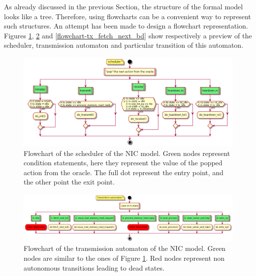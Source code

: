 \documentclass{kththesis}
\begin{document}
As already discussed in the previous Section, the structure of the formal model looks like a tree. Therefore, using flowcharts can be a convenient way to represent such structures. An attempt has been made to design a flowchart representation. Figures \ref{flowchart-scheduler}, \ref{flowchart-tx} and \ref{flowchart-tx_fetch_next_bd} show respectively a preview of the scheduler, transmission automaton and particular transition of this automaton.

\begin{figure}[h]
	\includegraphics[width=\textwidth]{figures/flowchart-scheduler.png}
	\centering
	\caption{Flowchart of the scheduler of the NIC model. Green nodes represent condition statements, here they represent the value of the popped action from the oracle. The full dot represent the entry point, and the other point the exit point.}
	\label{flowchart-scheduler}
\end{figure}

\begin{figure}[h]
	\includegraphics[width=\textwidth]{figures/flowchart-tx.png}
	\centering
	\caption{Flowchart of the transmission automaton of the NIC model. Green nodes are similar to the ones of Figure \ref{flowchart-scheduler}. Red nodes represent non autonomous transitions leading to dead states.}
	\label{flowchart-tx}
\end{figure}
\end{document}
